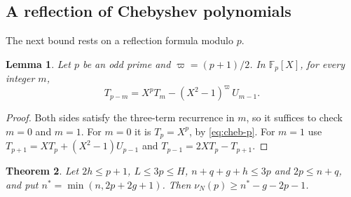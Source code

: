 \documentclass[11pt]{amsart}
\newtheorem{theorem}{Theorem}[section]
\newtheorem{lemma}[theorem]{Lemma}
\theoremstyle{definition}
\theoremstyle{remark}
\numberwithin{equation}{section}
\newcommand{\F}{\mathbb F}
\begin{document}
\subsection{A reflection of Chebyshev polynomials}
The next bound rests on a reflection formula modulo $p$.

\begin{lemma}\label{lem:u3-reflect}
Let $p$ be an odd prime and $\varpi=(p+1)/2$. In $\F_p[X]$, for every integer $m$,
\[
 T_{p-m}=X^pT_m-(X^2-1)^{\varpi}\,U_{m-1}.
\]
\end{lemma}

\begin{proof}
Both sides satisfy the three-term recurrence in $m$, so it suffices to check $m=0$ and $m=1$. For $m=0$ it
is $T_p=X^p$, by \eqref{eq:cheb-p}. For $m=1$ use $T_{p+1}=XT_p+(X^2-1)U_{p-1}$ and $T_{p-1}=2XT_p-T_{p+1}$.
\end{proof}

\begin{theorem}\label{thm:U}
Let $2h\le p+1$, $L\le3p\le H$, $n+q+g+h\le3p$ and $2p\le n+q$, and put $n^*=\min(n,2p+2g+1)$. Then
$\nu_N(p)\ge n^*-g-2p-1$.
\end{theorem}
\end{document}
